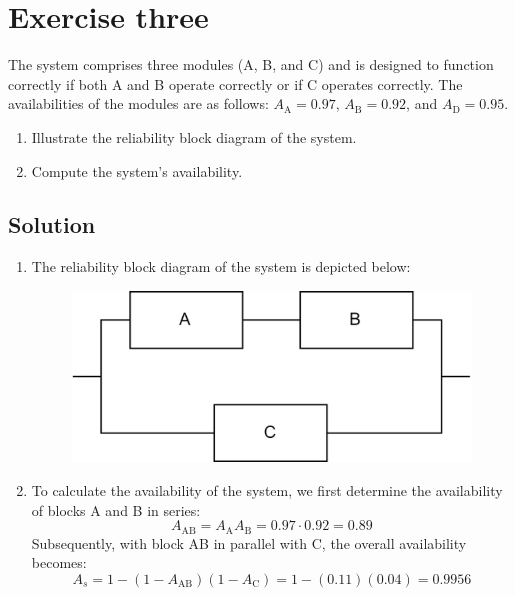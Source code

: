 \section{Exercise three}

The system comprises three modules (A, B, and C) and is designed to function correctly if both A and B operate correctly or if C operates correctly.
The availabilities of the modules are as follows: $A_{\text{A}} = 0.97$, $A_{\text{B}} = 0.92$, and $A_{\text{D}} = 0.95$.
\begin{enumerate}
    \item Illustrate the reliability block diagram of the system.
    \item Compute the system's availability.
\end{enumerate}

\subsection*{Solution}
\begin{enumerate}
    \item The reliability block diagram of the system is depicted below:
        \begin{figure}[H]
            \centering
            \includegraphics[width=0.5\linewidth]{images/rbd1.png}
        \end{figure}
    \item To calculate the availability of the system, we first determine the availability of blocks A and B in series:
        \[A_{\text{AB}}=A_{\text{A}}A_{\text{B}}=0.97\cdot 0.92=0.89\]
        Subsequently, with block AB in parallel with C, the overall availability becomes:
        \[A_{s}=1-\left(1-A_{\text{AB}}\right)\left(1-A_{\text{C}}\right)=1-(0.11)(0.04)=0.9956\]
\end{enumerate}
